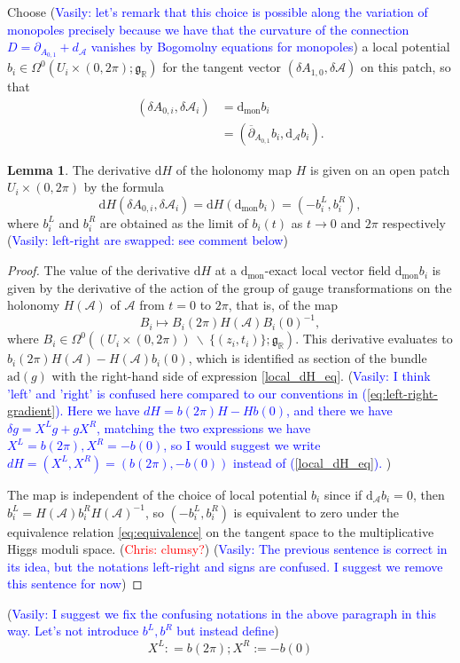 \documentclass[11pt, oneside, reqno]{amsart}
\theoremstyle{definition} \newtheorem{definition}{Definition}[section]
\newtheorem{lemma}[definition]{Lemma}
\theoremstyle{definition} \newtheorem{remark}[definition]{Remark}
\theoremstyle{definition} \newtheorem{remarks}[definition]{Remarks}
\theoremstyle{definition} \newtheorem{question}[definition]{Question}
\theoremstyle{definition} \newtheorem*{note}{Note}
\theoremstyle{definition} \newtheorem{example}[definition]{Example}
\theoremstyle{definition} \newtheorem{examples}[definition]{Examples}
\renewcommand{\gg}{\mathfrak{g}}
\newcommand{\mr}[1]{\mathrm{#1}}
\newcommand{\mc}[1]{\mathcal{#1}}
\newcommand{\bs}{\ \backslash \ }
\newcommand{\dd}{\partial}
\newcommand{\ol}[1]{\overline{#1}}
\newcommand{\RR}{\mathbb{R}}
\renewcommand{\d}{\mathrm{d}}
\newcommand{\ad}{\mr{ad}}
\newcommand{\chris}[1]{(\textcolor{red}{Chris: #1})}
\newcommand{\vasily}[1]{(\textcolor{blue}{Vasily: #1})}
\begin{document}
 Choose \vasily{let's remark that this choice is possible along
   the variation of  monopoles precisely because we have
   that the curvature of the connection $D = \dd_{A_{0,1}} + d_{\mc A}$
   vanishes by Bogomolny equations for monopoles} 
   a local potential $b_i \in \Omega^0(U_i \times (0,2\pi); \gg_\RR)$ for the tangent vector $(\delta A_{1,0}, \delta \mc A)$ on this patch, so that
\begin{align*} 
(\delta A_{0,i}, \delta \mc A_i) &= \d_{\mr{mon}} b_i \\
&= (\ol \dd_{A_{0,1}} b_i, \mr d_{\mc A} b_i).
\end{align*}

\begin{lemma} \label{local_derivative_description_lemma}
The derivative $\d H$ of the holonomy map $H$ is given on an open patch $U_i \times (0,2\pi)$ by the formula
\begin{equation}
\label{local_dH_eq}
\d H(\delta A_{0,i}, \delta \mc A_i) = \d H(\d_{\mr{mon}} b_i) = (- b_i^L, b_i^R),
\end{equation}
where $b_i^L$ and $b_i^R$ are obtained as the limit of $b_i(t)$ as $t \to 0$ and $2\pi$ respectively \vasily{left-right are swapped: see comment below} 
\end{lemma}


\begin{proof}
The value of the derivative $\d H$ at a $\d_{\mr{mon}}$-exact local vector field $\d_{\mr{mon}} b_i$ is given by the derivative of the action of the group of gauge transformations on the holonomy $H(\mc A)$ of $\mc A$ from $t=0$ to $2\pi$, that is, of the map 
\[B_i \mapsto B_i(2\pi)H(\mc A)B_i(0)^{-1},\]
where $B_i \in \Omega^0((U_i \times (0,2\pi)) \bs \{(z_i, t_i)\}; \gg_\RR)$.  This derivative evaluates to $b_i(2\pi) H(\mc A) - H(\mc A)b_i(0)$, which is identified as section of the bundle $\ad(g)$ with the right-hand side of expression \ref{local_dH_eq}. 
\vasily{I think 'left' and 'right' is confused here compared
  to our conventions in (\ref{eq:left-right-gradient}).
  Here we have $dH = b(2\pi) H  - H b(0)$,
  and there we have $\delta g  =  X^L g + g X^{R}$,
  matching the two expressions we have 
  $X^{L} = b(2 \pi), X^{R} = - b(0)$,
  so I would suggest we write $dH = (X^{L}, X^{R}) = ( b(2\pi), -b(0))$ instead
   of (\ref{local_dH_eq}). 
}



The map is independent of the choice of local potential $b_i$ since if $\d_{\mc A} b_i = 0$, then $b_i^L = H(\mc A) b_i^R H(\mc A)^{-1}$, so $(-b_i^L, b_i^R)$ is equivalent to zero under the equivalence relation \ref{eq:equivalence} on the tangent space to the multiplicative Higgs moduli space. \chris{clumsy?}
\vasily{The previous sentence is correct in its idea, but
  the notations left-right and signs are confused. I suggest we remove
  this sentence for now} 
\end{proof}
\vasily{I suggest we fix the confusing notations in the above
  paragraph in this way. Let's not
  introduce  $b^{L}, b^{R}$ but instead define}
  \begin{equation}
    X^{L}: = b(2\pi); X^{R}:=-b(0) 
  \end{equation}
\end{document}
